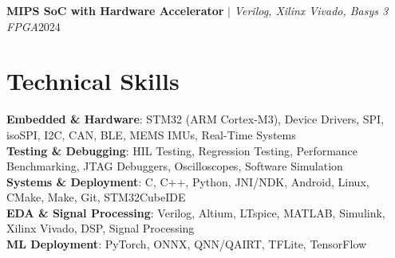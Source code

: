 \documentclass[letterpaper,11pt]{article}
\begin{document}
    \resumeProjectHeading
      {\textbf{MIPS SoC with Hardware Accelerator} $|$ \emph{Verilog, Xilinx Vivado, Basys 3 FPGA}}{2024}
      \resumeItemListStart
      \resumeItemListEnd
  \resumeSubHeadingListEnd

\section{Technical Skills}
  \resumeSubHeadingListStart
    \small{\item{
      \textbf{Embedded \& Hardware}{: STM32 (ARM Cortex-M3), Device Drivers, SPI, isoSPI, I2C, CAN, BLE, MEMS IMUs, Real-Time Systems} \\
      \textbf{Testing \& Debugging}{: HIL Testing, Regression Testing, Performance Benchmarking, JTAG Debuggers, Oscilloscopes, Software Simulation} \\
      \textbf{Systems \& Deployment}{: C, C++, Python, JNI/NDK, Android, Linux, CMake, Make, Git, STM32CubeIDE} \\
      \textbf{EDA \& Signal Processing}{: Verilog, Altium, LTspice, MATLAB, Simulink, Xilinx Vivado, DSP, Signal Processing} \\
      \textbf{ML Deployment}{: PyTorch, ONNX, QNN/QAIRT, TFLite, TensorFlow}
    }}
  \resumeSubHeadingListEnd
\end{document}

